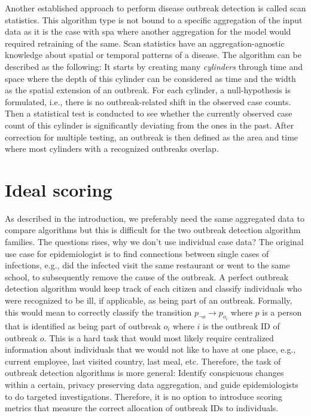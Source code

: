 \documentclass[a4paper, 12pt, one column]{article}
\begin{document}
Another established approach to perform disease outbreak detection is called scan statistics. This algorithm type is not bound to a specific aggregation of the input data as it is the case with \ac{spa} where another aggregation for the model would required retraining of the same. Scan statistics have an aggregation-agnostic knowledge about spatial or temporal patterns of a disease. The algorithm can be described as the following: It starts by creating many \emph{cylinders} through time and space where the depth of this cylinder can be considered as time and the width as the spatial extension of an outbreak. For each cylinder, a null-hypothesis is formulated, i.e., there is no outbreak-related shift in the observed case counts. Then a statistical test is conducted to see whether the currently observed case count of this cylinder is significantly deviating from the ones in the past. After correction for multiple testing, an outbreak is then defined as the area and time where most cylinders with a recognized outbreaks overlap.

\section{Ideal scoring}

As described in the introduction, we preferably need the same aggregated data to compare algorithms but this is difficult for the two outbreak detection algorithm families. The questions rises, why we don't use individual case data? The original use case for epidemiologist is to find connections between single cases of infections, e.g., did the infected visit the same restaurant or went to the same school, to subsequently remove the cause of the outbreak. A perfect outbreak detection algorithm would keep track of each citizen and classify individuals who were recognized to be ill, if applicable, as being part of an outbreak. Formally, this would mean to correctly classify the transition \(p_{\neg o} \to p_{o_i}\) where \(p\) is a person that is identified as being part of outbreak \(o_i\) where \(i\) is the outbreak ID of outbreak \(o\). This is a hard task that would most likely require centralized information about individuals that we would not like to have at one place, e.g., current employee, last visited country, last meal, etc. Therefore, the task of outbreak detection algorithms is more general: Identify conspicuous changes within a certain, privacy preserving data aggregation, and guide epidemiologists to do targeted investigations. Therefore, it is no option to introduce scoring metrics that measure the correct allocation of outbreak IDs to individuals.
\end{document}

